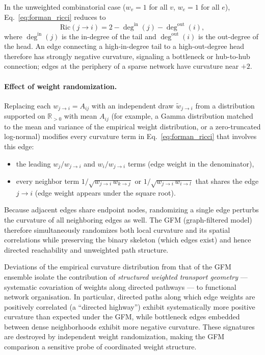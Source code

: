 \documentclass[aps,superscriptaddress,11pt]{revtex4-2}
\theoremstyle{definition}
\theoremstyle{plain}
\begin{document}
In the unweighted combinatorial case ($w_v=1$ for all $v$, $w_e=1$ for
all $e$), Eq.~\eqref{eq:forman_ricci} reduces to
\begin{equation}
  \mathrm{Ric}(j\to i)
  = 2 - \deg^{\mathrm{in}}(j) - \deg^{\mathrm{out}}(i),
  \label{eq:forman_combinatorial}
\end{equation}
where $\deg^{\mathrm{in}}(j)$ is the in-degree of the tail and
$\deg^{\mathrm{out}}(i)$ is the out-degree of the head.  An edge
connecting a high-in-degree tail to a high-out-degree head therefore
has strongly negative curvature, signaling a bottleneck or hub-to-hub
connection; edges at the periphery of a sparse network have curvature
near $+2$.

\paragraph*{Effect of weight randomization.}

Replacing each $w_{j\to i} = A_{ij}$ with an independent draw
$\tilde{w}_{j\to i}$ from a distribution supported on $\mathbb{R}_{>0}$
with mean $A_{ij}$ (for example, a Gamma distribution matched to the
mean and variance of the empirical weight distribution, or a
zero-truncated log-normal) modifies every curvature term in
Eq.~\eqref{eq:forman_ricci} that involves this edge:
\begin{itemize}
  \item the leading $w_j/w_{j\to i}$ and $w_i/w_{j\to i}$ terms
        (edge weight in the denominator),
  \item every neighbor term $1/\sqrt{w_{j\to i}\,w_{k\to j}}$ or
        $1/\sqrt{w_{j\to i}\,w_{i\to l}}$ that shares the edge
        $j\to i$ (edge weight appears under the square root).
\end{itemize}
Because adjacent edges share endpoint nodes, randomizing a single edge
perturbs the curvature of all neighboring edges as well.  The GFM
(graph-filtered model) therefore simultaneously randomizes both local
curvature and its spatial correlations while preserving the binary
skeleton (which edges exist) and hence directed reachability and
unweighted path structure.

Deviations of the empirical curvature distribution from that of the
GFM ensemble isolate the contribution of \emph{structured weighted
transport geometry} — systematic covariation of weights along directed
pathways — to functional network organisation.  In particular, directed
paths along which edge weights are positively correlated (a
``directed highway'') exhibit systematically more positive curvature
than expected under the GFM, while bottleneck edges embedded between
dense neighborhoods exhibit more negative curvature.  These signatures
are destroyed by independent weight randomization, making the GFM
comparison a sensitive probe of coordinated weight structure.
\end{document}
